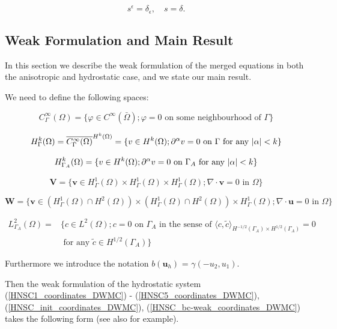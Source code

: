 \documentclass[12pt]{report}
\numberwithin{theorem}{chapter}
\numberwithin{corollary}{chapter}
\numberwithin{lemma}{chapter}
\numberwithin{remark}{chapter}
\numberwithin{definition}{chapter}
\numberwithin{prop}{chapter}
\begin{document}
\begin{equation}
  s^\epsilon = \delta_\epsilon, \quad s = \delta.
\end{equation}

\subsection{Weak Formulation and Main Result} \label{weakformulationmainresult_dwmc}

In this section we describe the weak formulation of the merged equations in both the anisotropic and hydrostatic case, and we state our main result.
  
  We need to define the following spaces:
  
  \[ C^{\infty}_\Gamma (\Omega) = \{ \varphi \in C^\infty (\bar{\Omega}); \varphi = 0 \text{ on some neighbourhood of } \Gamma\} \]
  
  \[ H^k_{\Gamma} (\Omega) = \overline{C_\Gamma ^ \infty (\Omega)} ^ {H^k (\Omega)} = \{ v \in H^k(\Omega); \partial^\alpha v=0 \text{ on } \Gamma \text{ for any } \abs{\alpha} < k \} \]
  
  \[ H^k_{\Gamma_A} (\Omega) = \{ v \in H^k(\Omega); \partial^\alpha v=0 \text{ on } \Gamma_A \text{ for any } \abs{\alpha} < k \} \]
  
  \[ \mathbf{V} = \{ \mathbf{v} \in  H^1_{\Gamma} (\Omega) \times H^1_{\Gamma} (\Omega) \times H^1_{\Gamma} (\Omega); \nabla \cdot \mathbf{v} = 0 \text{ in } \Omega \} \]
  
  \[ \mathbf{W} = \{ \mathbf{v} \in  (H^1_{\Gamma} (\Omega) \cap H^2(\Omega)) \times (H^1_{\Gamma} (\Omega) \cap H^2(\Omega)) \times H^1_{\Gamma} (\Omega); \nabla \cdot \mathbf{u} = 0 \text{ in } \Omega \} \]
  
\begin{align}
L^2_{\Gamma_A}(\Omega) = & \{ c \in L^2(\Omega); c = 0 \text{ on } \Gamma_A \text{ in the sense of } \langle c , \tilde{c} \rangle_{H^{-1/2} (\Gamma_A) \times H^{1/2} (\Gamma_A)} = 0 \nonumber \\
& \text{ for any } \tilde{c} \in H^{1/2}(\Gamma_A) \nonumber \}
\end{align}
  
Furthermore we introduce the notation $b(\mathbf{u}_h)$ = $\gamma (-u_2 , u_1).$
  
Then the weak formulation of the hydrostatic system (\ref{HNSC1_coordinates_DWMC}) - (\ref{HNSC5_coordinates_DWMC}), (\ref{HNSC_init_coordinates_DWMC}), (\ref{HNSC_bc-weak_coordinates_DWMC}) takes the following form (see also \cite{cao2007global} for example).
  
\end{document}
